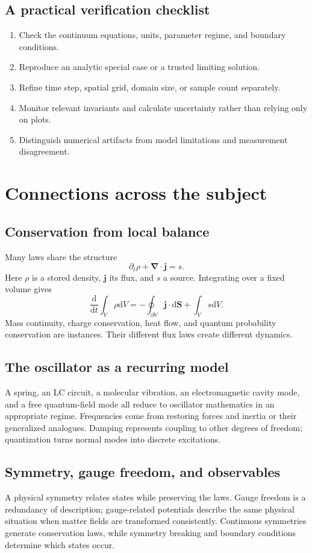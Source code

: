 \documentclass[11pt,oneside]{book}
\newcommand{\dd}{\mathrm{d}}
\newcommand{\vect}[1]{\boldsymbol{#1}}
\newcommand{\grad}{\boldsymbol{\nabla}}
\newcommand{\od}[2]{\frac{\dd #1}{\dd #2}}
\theoremstyle{reviewstyle}
\begin{document}
\section{A practical verification checklist}
\begin{enumerate}
\item Check the continuum equations, units, parameter regime, and boundary conditions.
\item Reproduce an analytic special case or a trusted limiting solution.
\item Refine time step, spatial grid, domain size, or sample count separately.
\item Monitor relevant invariants and calculate uncertainty rather than relying only on plots.
\item Distinguish numerical artifacts from model limitations and measurement disagreement.
\end{enumerate}

\chapter{Connections across the subject}
\section{Conservation from local balance}
Many laws share the structure
\begin{equation}\partial_t\rho+\grad\cdot\vect j=s.\end{equation}
Here $\rho$ is a stored density, $\vect j$ its flux, and $s$ a source. Integrating over a fixed volume gives
\begin{equation}\od{}{t}\int_V\rho\dd V=-\oint_{\partial V}\vect j\cdot\dd\vect S+\int_Vs\dd V.\end{equation}
Mass continuity, charge conservation, heat flow, and quantum probability conservation are instances. Their different flux laws create different dynamics.
\section{The oscillator as a recurring model}
A spring, an LC circuit, a molecular vibration, an electromagnetic cavity mode, and a free quantum-field mode all reduce to oscillator mathematics in an appropriate regime. Frequencies come from restoring forces and inertia or their generalized analogues. Damping represents coupling to other degrees of freedom; quantization turns normal modes into discrete excitations.
\section{Symmetry, gauge freedom, and observables}
A physical symmetry relates states while preserving the laws. Gauge freedom is a redundancy of description; gauge-related potentials describe the same physical situation when matter fields are transformed consistently. Continuous symmetries generate conservation laws, while symmetry breaking and boundary conditions determine which states occur.
\end{document}
